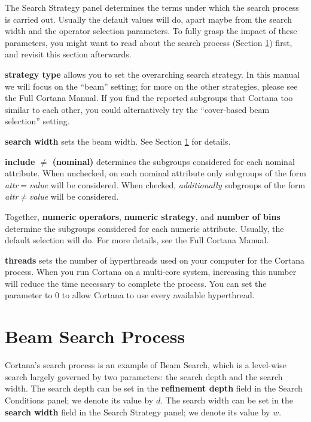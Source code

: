 \documentclass{article}
\begin{document}
The Search Strategy panel determines the terms under which the search
process is carried out.  Usually the default values will do, apart maybe
from the search width and the operator selection parameters. To fully grasp
the impact of these parameters, you might want to read about the search
process (Section \ref{sec:searchprocess}) first, and revisit this section
afterwards.

\textbf{strategy type} allows you to set the overarching search strategy. 
In this manual we will focus on the ``beam'' setting; for more on the other
strategies, please see the Full Cortana Manual.  If you find the reported
subgroups that Cortana too similar to each other, you could alternatively
try the ``cover-based beam selection'' setting.

\textbf{search width} sets the beam width. See Section
\ref{sec:searchprocess} for details.

\textbf{include $\neq$ (nominal)} determines the subgroups considered for
each nominal attribute.  When unchecked, on each nominal attribute only
subgroups of the form \emph{attr}$=$\emph{value} will be considered.  When
checked, \emph{additionally} subgroups of the form
\emph{attr}$\neq$\emph{value} will be considered.

Together, \textbf{numeric operators}, \textbf{numeric strategy}, and
\textbf{number of bins} determine the subgroups considered for each numeric
attribute.  Usually, the default selection will do.  For more details, see
the Full Cortana Manual.

\textbf{threads} sets the number of hyperthreads used on your computer for
the Cortana process.  When you run Cortana on a multi-core system,
increasing this number will reduce the time necessary to complete the
process.  You can set the parameter to $0$ to allow Cortana to use every
available hyperthread.

\section{Beam Search Process}
\label{sec:searchprocess}

Cortana's search process is an example of Beam Search, which is a level-wise
search largely governed by two parameters: the \gls{search depth} and the
\gls{search width}.  The search depth can be set in the \textbf{refinement
depth} field in the Search Conditions panel; we denote its value by $d$. 
The search width can be set in the \textbf{search width} field in the Search
Strategy panel; we denote its value by $w$.
\end{document}
